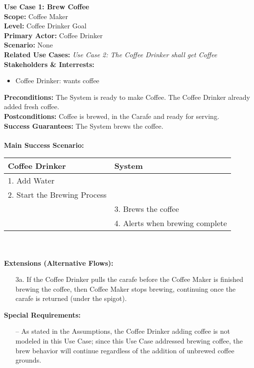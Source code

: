 \documentclass[letterpaper]{article}
\begin{document}
\noindent
\textbf{Use Case 1: Brew Coffee}\\
\textbf{Scope: }Coffee Maker\\
\textbf{Level: }Coffee Drinker Goal\\
\textbf{Primary Actor: }Coffee Drinker\\
\textbf{Scenario: }None\\
\textbf{Related Use Cases: }\textit{Use Case 2:  The Coffee Drinker
shall get Coffee}\\
\textbf{Stakeholders \& Interrests: }
\begin{itemize}
\item Coffee Drinker: wants coffee
\end{itemize}
\textbf{Preconditions: }The System is ready to make Coffee.  The
Coffee Drinker already added fresh coffee.\\
\textbf{Postconditions: }Coffee is brewed, in the Carafe and ready for
serving.\\
\textbf{Success Guarantees: }The System brews the coffee.\\\\
\textbf{Main Success Scenario: }\\
\begin{tabular}{|p{5.75cm}|p{5.75cm}|}\hline
\textbf{Coffee Drinker} & \textbf{System}\\\hline
1.  Add Water & \\\hline
2.  Start the Brewing Process &\\\hline
& 3. Brews the coffee\\\hline
& 4. Alerts when brewing complete\\\hline
\end{tabular}\\\\
\textbf{Extensions (Alternative Flows): }
\begin{itemize}
\item[3a.]
If the Coffee Drinker pulls the carafe before the Coffee Maker
is finished brewing the coffee, then Coffee Maker stops brewing,
continuing once the carafe is returned (under the spigot).
\end{itemize}
\textbf{Special Requirements:  }
\begin{itemize}
\item [--]As stated in the Assumptions, the Coffee Drinker adding
coffee
is not modeled in this Use Case; since this Use Case addressed brewing
coffee, the brew behavior will continue regardless of the addition of
unbrewed coffee grounds.
\end{itemize}
\end{document}
